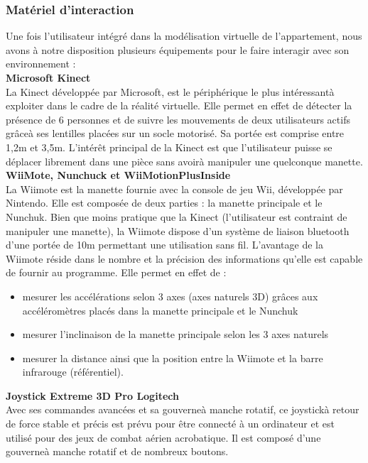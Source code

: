 \subsubsection{Matériel d'interaction}
Une fois l'utilisateur intégré dans la modélisation virtuelle de l'appartement, nous avons à notre disposition plusieurs équipements pour le faire interagir avec son environnement :
\\

\textbf{Microsoft Kinect}
\\

La Kinect développée par Microsoft, est le périphérique le plus intéressantà exploiter dans le cadre de la réalité virtuelle. Elle permet en effet de détecter la présence de 6 personnes et de suivre les mouvements de deux utilisateurs actifs grâceà ses lentilles placées sur un socle motorisé. Sa portée est comprise entre 1,2m et 3,5m. L'intérêt principal de la Kinect est que l'utilisateur puisse se déplacer librement dans une pièce sans avoirà manipuler une quelconque manette.
\\

\textbf{WiiMote, Nunchuck et WiiMotionPlusInside}
\\

La Wiimote est la manette fournie avec la console de jeu Wii, développée par Nintendo. Elle est composée de deux parties : la manette principale et le Nunchuk. Bien que moins pratique que la Kinect (l'utilisateur est contraint de manipuler une manette), la Wiimote dispose d'un système de liaison bluetooth d'une portée de 10m permettant une utilisation sans fil. L'avantage de la Wiimote réside dans le nombre et la précision des informations qu'elle est capable de fournir au programme. 
\newline
Elle permet en effet de :
\begin{itemize}
  \item mesurer les accélérations selon 3 axes (axes naturels 3D) grâces aux accéléromètres placés dans la manette principale et le Nunchuk
  \item mesurer l'inclinaison de la manette principale selon les 3 axes naturels
  \item mesurer la distance ainsi que la position entre la Wiimote et la barre infrarouge (référentiel).
\end{itemize}

\textbf{Joystick Extreme 3D Pro Logitech}
\\

Avec ses commandes avancées et sa gouverneà manche rotatif, ce joystickà retour de force stable et précis est prévu pour être connecté à un ordinateur et est utilisé pour des jeux de combat aérien acrobatique. Il est composé d'une gouverneà manche rotatif et de nombreux boutons.
\\

